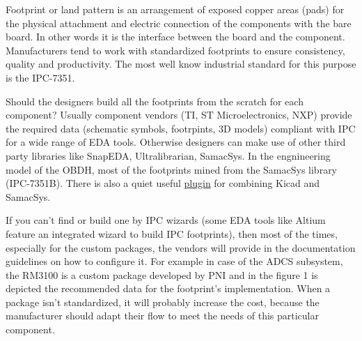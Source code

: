 \documentclass[final]{cubedoc}
\begin{document}
	
	
	
	Footprint or land pattern is an arrangement of exposed copper areas (pads) for the physical attachment and electric connection of the components with the bare board. In other words it is the interface between the board and the component. Manufacturers tend to work with standardized footprints to ensure consistency, quality and productivity. The most well know industrial standard for this purpose is the IPC-7351. 
	
	Should the designers build all the footprints from the scratch for each component? Usually component vendors (TI, ST Microelectronics, NXP) provide the required data (schematic symbols, footrpints, 3D models) compliant with IPC for a wide range of EDA tools. Otherwise designers can make use of other third party libraries like SnapEDA, Ultralibrarian, SamacSys. In the engnineering model of the OBDH, most of the footprints mined from the SamacSys library (IPC-7351B). There is also a quiet useful \href{https://www.samacsys.com/kicad-libraries/}{plugin} for combining Kicad and SamacSys.
	
	If you can't find or build one by IPC wizards (some EDA tools like Altium feature an integrated wizard to build IPC footprints), then most of the times, especially for the custom packages, the vendors will provide in the documentation guidelines on how to configure it. For example in case of the ADCS subsystem, the RM3100 is a custom package developed by PNI and in the figure 1 is depicted the recommended data for the footprint's implementation. When a package isn't standardized, it will probably increase the cost, because the manufacturer should adapt their flow to meet the needs of this particular component. %
	
\end{document}
